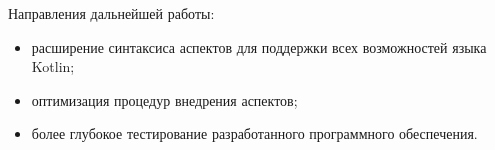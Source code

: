 \documentclass[conference]{IEEEtran}
\begin{document}
Направления дальнейшей работы:
\begin{itemize}
    \item расширение синтаксиса аспектов для поддержки всех возможностей языка
          Kotlin;
    \item оптимизация процедур внедрения аспектов;
    \item более глубокое тестирование разработанного программного обеспечения.
\end{itemize}


%




\nocite{*}

\printbibliography
\end{document}
